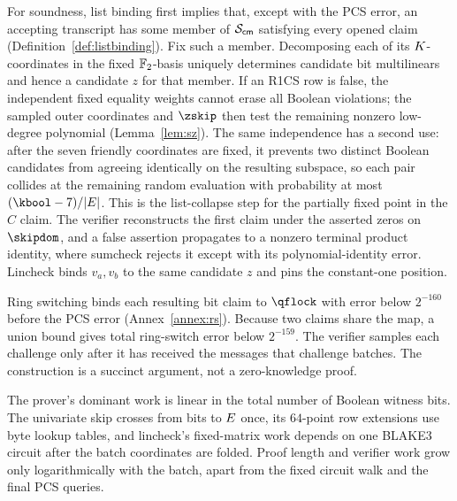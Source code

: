For soundness, list binding first implies that, except with the PCS error, an accepting transcript has some member of $\mathcal{S}_{\mathsf{cm}}$ satisfying every opened claim (Definition~\ref{def:listbinding}). Fix such a member. Decomposing each of its $K$-coordinates in the fixed $\mathbb{F}_2$-basis uniquely determines candidate bit multilinears and hence a candidate $z$ for that member. If an R1CS row is false, the independent fixed equality weights cannot erase all Boolean violations; the sampled outer coordinates and $\zskip$ then test the remaining nonzero low-degree polynomial (Lemma~\ref{lem:sz}). The same independence has a second use: after the seven friendly coordinates are fixed, it prevents two distinct Boolean candidates from agreeing identically on the resulting subspace, so each pair collides at the remaining random evaluation with probability at most $(\kbool-7)/|\E|$. This is the list-collapse step for the partially fixed point in the $C$ claim. The verifier reconstructs the first claim under the asserted zeros on $\skipdom$, and a false assertion propagates to a nonzero terminal product identity, where sumcheck rejects it except with its polynomial-identity error. Lincheck binds $v_a,v_b$ to the same candidate $z$ and pins the constant-one position.

Ring switching binds each resulting bit claim to $\qflock$ with error below $2^{-160}$ before the PCS error (Annex~\ref{annex:rs}). Because two claims share the map, a union bound gives total ring-switch error below $2^{-159}$. The verifier samples each challenge only after it has received the messages that challenge batches. The construction is a succinct argument, not a zero-knowledge proof.

The prover's dominant work is linear in the total number of Boolean witness bits. The univariate skip crosses from bits to $E$ once, its $64$-point row extensions use byte lookup tables, and lincheck's fixed-matrix work depends on one BLAKE3 circuit after the batch coordinates are folded. Proof length and verifier work grow only logarithmically with the batch, apart from the fixed circuit walk and the final PCS queries.
